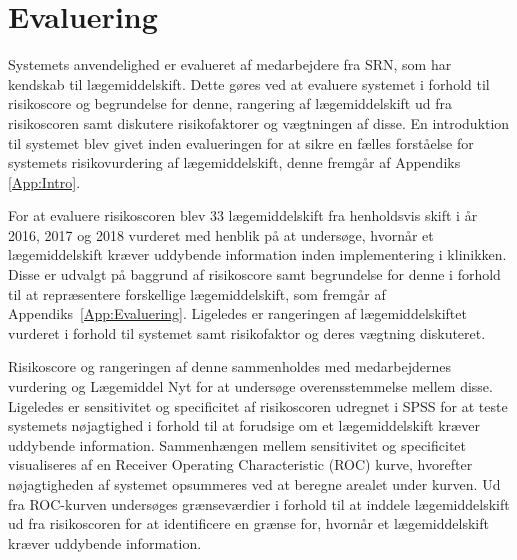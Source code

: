 \section{Evaluering}
Systemets anvendelighed er evalueret af medarbejdere fra SRN, som har kendskab til lægemiddelskift. Dette gøres ved at evaluere systemet i forhold til risikoscore og begrundelse for denne, rangering af lægemiddelskift ud fra risikoscoren samt diskutere risikofaktorer og vægtningen af disse. En introduktion til systemet blev givet inden evalueringen for at sikre en fælles forståelse for systemets risikovurdering af lægemiddelskift, denne fremgår af Appendiks \ref{App:Intro}. 

For at evaluere risikoscoren blev 33 lægemiddelskift fra henholdsvis skift i år 2016, 2017 og 2018 vurderet med henblik på at undersøge, hvornår et lægemiddelskift kræver uddybende information inden implementering i klinikken. Disse er udvalgt på baggrund af risikoscore samt begrundelse for denne i forhold til at repræsentere forskellige lægemiddelskift, som fremgår af Appendiks~\ref{App:Evaluering}. Ligeledes er rangeringen af lægemiddelskiftet vurderet i forhold til systemet samt risikofaktor og deres vægtning diskuteret. 

Risikoscore og rangeringen af denne sammenholdes med medarbejdernes vurdering og Lægemiddel Nyt for at undersøge overensstemmelse mellem disse. Ligeledes er sensitivitet og specificitet af risikoscoren udregnet i SPSS for at teste systemets nøjagtighed i forhold til at forudsige om et lægemiddelskift kræver uddybende information. Sammenhængen mellem sensitivitet og specificitet visualiseres af en Receiver Operating Characteristic (ROC) kurve, hvorefter nøjagtigheden af systemet opsummeres ved at beregne arealet under kurven. Ud fra ROC-kurven undersøges grænseværdier i forhold til at inddele lægemiddelskift ud fra risikoscoren for at identificere en grænse for, hvornår et lægemiddelskift kræver uddybende information.



